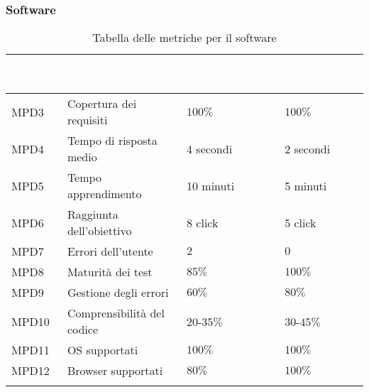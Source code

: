 \subsubsection{Software}
\begin{center}
  \renewcommand{\arraystretch}{1.25}
  \begin{longtable}{|p{1.8cm}|p{4.5cm}|p{3.8cm}|p{3.5cm}|} \hline
    \rowcolor[HTML]{036400}
    \textcolor{white}{\textbf{Metrica}} & \textcolor{white}{\textbf{Nome}} & \textcolor{white}{\textbf{Valore Accettabile}} & \textcolor{white}{\textbf{Valore Ottimale}}   \\ \hline
      \rowcolor[HTML]{EFEFEF}
      MPD3 & Copertura dei requisiti & $100\%$ & $100\%$  \\ \hline
      \rowcolor[HTML]{C0C0C0}
      MPD4 & Tempo di risposta medio    &  4 secondi  &  2 secondi   \\ \hline
      \rowcolor[HTML]{EFEFEF}
      MPD5 & Tempo apprendimento    & 10 minuti  & 5 minuti       \\ \hline
      \rowcolor[HTML]{C0C0C0}
      MPD6 & Raggiunta dell'obiettivo    & 8 click   & 5 click     \\ \hline
      \rowcolor[HTML]{EFEFEF}
      MPD7 & Errori dell'utente    & $2$      & $0$        \\ \hline
      \rowcolor[HTML]{C0C0C0}
      MPD8 & Maturità dei test    & $85\%$ &  $100\%$    \\ \hline
      \rowcolor[HTML]{EFEFEF}
      MPD9 & Gestione degli errori    & $60\%$ & $80\%$     \\ \hline
      \rowcolor[HTML]{C0C0C0}
      MPD10 & Comprensibilità del codice    & $20$-$35\%$ & $30$-$45\%$     \\ \hline
      \rowcolor[HTML]{EFEFEF}
      MPD11 & OS supportati    & $100\%$ & $100\%$     \\ \hline
      \rowcolor[HTML]{C0C0C0}
      MPD12 & Browser supportati    & $80\%$ & $100\%$     \\ \hline
      \caption{Tabella delle metriche per il software}
  \end{longtable}
\end{center}
